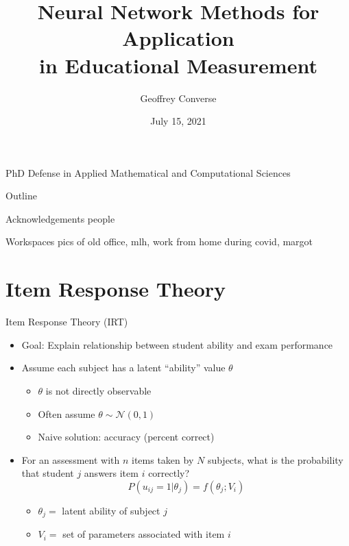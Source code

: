 \documentclass{beamer}
\title[Neural Network Methods for Application in Educational Measurement]{Neural Network Methods for Application \\ in Educational Measurement}
\author{Geoffrey Converse}
\institute{University of Iowa}
\date{July 15, 2021}
\theoremstyle{definition}
\begin{document}
\begin{frame}
  \titlepage
  \begin{center}
  {\scriptsize PhD Defense in Applied Mathematical and Computational Sciences}
  \end{center}
\end{frame}


\begin{frame}{Outline}
  \tableofcontents
\end{frame}

\begin{frame}{Acknowledgements}
  people
\end{frame}

\begin{frame}{Workspaces}
  pics of old office, mlh, work from home during covid, margot
\end{frame}

\section{Item Response Theory}

\begin{frame}{Item Response Theory (IRT)}
\begin{itemize}
  \item Goal: Explain relationship between student ability and exam performance
  \item Assume each subject has a latent ``ability'' value $\theta$
  \begin{itemize}
    \item<2-> $\theta$ is not directly observable
    \item<2-> Often assume $\theta \sim \mathcal{N}(0,1)$
    \item<2-> Naive solution: accuracy (percent correct)
  \end{itemize}
  \item<3> For an assessment with $n$ items taken by $N$ subjects, what is the probability that student $j$ answers item $i$ correctly?
  \[P(u_{ij}=1 | \theta_j) = f(\theta_j; V_i)\]
  \begin{itemize}
    \item<3> $\theta_j =$ latent ability of subject $j$
    \item<3> $V_i =$ set of parameters associated with item $i$
  \end{itemize}
\end{itemize}
\end{frame}
\end{document}
